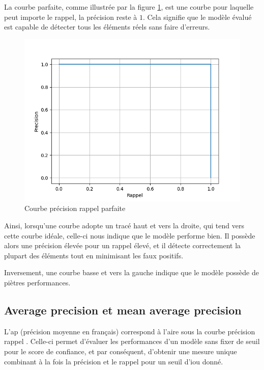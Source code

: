 La courbe parfaite, comme illustrée par la figure \ref{fig:perfect_precision_recall_curve}, est une courbe pour laquelle peut importe le rappel, la précision reste à $1$. Cela signifie que le modèle évalué est capable de détecter tous les éléments réels sans faire d'erreurs.

\begin{figure}[hbt!]
    \centering
    \includegraphics[scale=0.7]{Figures/model_evaluation/perfect_precision_recall_curve.png}
    \caption{Courbe précision rappel parfaite}
    \label{fig:perfect_precision_recall_curve}
\end{figure}

\break

Ainsi, lorsqu'une courbe adopte un tracé haut et vers la droite, qui tend vers cette courbe idéale, celle-ci nous indique que le modèle performe bien. Il possède alors une précision élevée pour un rappel élevé, et il détecte correctement la plupart des éléments tout en minimisant les faux positifs.

Inversement, une courbe basse et vers la gauche indique que le modèle possède de piètres performances.

\subsection{Average precision et mean average precision}

L'\acrfull{ap} (précision moyenne en français) correspond à l'aire sous la courbe précision rappel \cite{padilla_rafaelpadillaobject-detection-metrics_2024}. Celle-ci permet d'évaluer les performances d'un modèle sans fixer de seuil pour le score de confiance, et par conséquent, d'obtenir une mesure unique combinant à la fois la précision et le rappel pour un seuil d'\acrshort{iou} donné.

